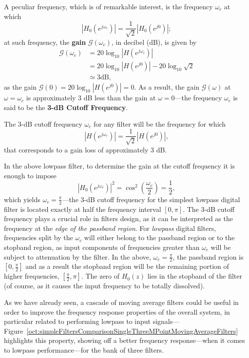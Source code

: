 \documentclass[\documentfontsize, twocolumn]{\classname}
\begin{document}
A peculiar frequency, which is of remarkable interest, is the frequency $\omega_c$ at which
\[
    \left|H_0(e^{j\omega_c})\right| = \frac{1}{\sqrt{2}} \left|H_0(e^{j0})\right|;
\]
at such frequency, the \textbf{gain} $\mathcal G (\omega_c)$, in decibel (dB), is given by
\begin{align*}
    \mathcal G(\omega_c) &= 20\log_{10}\left|H(e^{j\omega_c})\right|\\
                         &= 20\log_{10}\left|H(e^{j0})\right| - 20\log_{10}\sqrt{2}\\
                         &\simeq 3 \mbox{dB},
\end{align*}
as the gain $\mathcal G(0) = 20 \log_{10}\left|H(e^{j0})\right| = 0$. As a result, the gain $\mathcal G(\omega)$ at $\omega = \omega_c$ is approximately $3$ dB less than the gain at $\omega = 0$---the frequency $\omega_c$ is said to be the \textbf{3-dB Cutoff Frequency}.

The 3-dB cutoff frequency $\omega_c$ for any filter will be the frequency for which
\begin{equation}\label{eqn:cutoffFrequency}
    \left|H(e^{j\omega_c})\right| = \frac{1}{\sqrt{2}} \left|H(e^{j0})\right|,
\end{equation}
that corresponds to a gain loss of approximately $3$ dB.

In the above lowpass filter, to determine the gain at the cutoff frequency it is enough to impose
\[
    \left|H_0(e^{j\omega_c})\right|^2 = \cos^2{(\frac {\omega_c} {2})} = \frac 1 2,
\]
which yields $\omega_c = \frac \pi 2$---the $3$-dB cutoff frequency for the simplest lowpass digital filter is located exactly at half the frequency interval $[0, \pi]$.
The $3$-dB cutoff frequency plays a crucial role in filters design, as it can be interpreted as the frequency at the \emph{edge of the passband region}.
For \emph{lowpass} digital filters, frequencies split by the $\omega_c$ will either belong to the passband region or to the stopband region, as input components of frequencies greater than $\omega_c$ will be subject to attenuation by the filter.
In the above, $\omega_c = \frac \pi 2$, the passband region is $[0, \frac \pi 2]$ and as a result the stopband region will be the remaining portion of higher frequencies, $[\frac \pi 2, \pi]$.
The zero of $H_0(z)$ lies in the stopband of the filter (of course, as it causes the input frequency to be totally dissolved).

As we have already seen, a cascade of moving average filters could be useful in order to improve the frequency response properties of the overall system, in particular related to performing lowpass to input signals---Figure~\ref{oct:simpleFiltersComparisonSingleThreeMPointMovingAverageFilters} highlights this property, showing off a better frequency response---when it comes to lowpass performance---for the bank of three filters.
\end{document}
